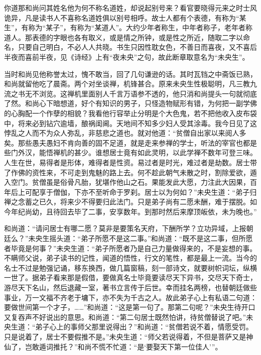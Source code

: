 \documentclass[a4paper,12pt,UTF8,twoside]{ctexbook}
\begin{document}
你道那和尚问其姓名他为何不称名道姓，却说起别号来？看官要晓得元来之时士风诡异，凡是读书人不喜称名道姓俱以别号相呼。故士人都有个表德，有称为“某生”，有称为“某子”，有称为“某道人”。大约少年者称生，中年者称子，老年者称道人。那表德的字眼也各有取义，或是情之所钟，或是性之所近，随取二字以命名，只要自己明白，不必人人共晓。书生只因性耽女色，不善日而喜夜，又不喜后半夜而喜前半夜，见《诗经》上有“夜未央”之句，故此断章取意名为“未央生”。

当时和尚见他称誉太过，愧不敢当，回了几句谦逊的话。其时瓦铛之中斋饭已熟，和尚就留他吃了晨斋。两个对坐谈禅，机锋甚合。原来未央生性极聪明，凡三教九流之书无不浏览。这禅机里面别人千言万语参不透的，他只消和尚提头一句就彻底了然。和尚心下暗想道，好个有知识的男子，只怪造物赋形有错，为何把一副学佛的心胸配一个作孽的相貌？我看他行容举止分明是个大色鬼，若不把他收入皮布袋中，将来必到钻穴逾墙，酿祸闺阃。天地间不知多少妇人受其涂毒。我今日见了这悖乱之人而不为众人弥乱，非慈悲之道也。就对他道：“贫僧自出家以来阅人多矣。那些愚夫愚妇不肯向善的固不足道，就是走来参禅的学士，听法的宰官也都是些门外汉，能悟禅机的甚少。谁想居士竟有如此灵明，以此学禅不数年可登三味。人生在世，易得者是形体，难得者是性资。易过者是时光，难过者是劫数。居士带了作佛的资性来，不可走到鬼魅的路上去。何不趁此朝气未散之时，割除爱欲，遁入空门。贫僧虽是俗骨凡胎，犹堪作他山之石。果能发此大愿，力注此大因果，百年后上可配享于僧伽，下亦不至听命于罗刹。居士以为何如？”未央生道：“弟子归禅之念蓄之已久，将来少不得要归此法门。只是弟子尚有二愿未酬，难于摆脱。如今年纪尚幼，且待回去毕了二事，安享数年。到那时然后来摩顶皈依，未为晚也。”

和尚道：“请问居士有哪二愿？莫非是要策名天府，下酬所学？立功异域，上报朝廷么？”未央生摇头道：“弟子所愿不是这二事。”和尚道：“既不是这二事，但所愿者毕竟是何事？”未央生道：“弟子所愿者乃是自己力量做得来的，不是妄想的事。不瞒师父说，弟子读书的记性，闻道的悟性，行文的笔性，都是最上一流。当今的名士不过是勉强记诵，移东换西，做几篇窗稿，刻一部诗文，就要树帜词坛，纵横一世了。据弟子看来那是假借，要做真名士毕竟要读尽天下异书，交尽天下奇士，游尽天下名山，然后退藏一室，著书立言传于后世。幸而挂名两榜，也替朝廷做些事业，万一文福不齐老于墉下，亦不失为千古之人。故此弟子心上有私语二句道：要做世间第一个才子，……”和尚道：“这是第一句了。那第二句呢？”未央生待开口又复吞声不好说出的意思。和尚道：“第二句居士既然怕讲，待贫僧替说了吧。”未央生道：“弟子心上的事师父那里说得出？”和尚道：“贫僧若说不着，情愿受罚。只是说着了，居士不要假推不是。”未央生道：“师父若说得着，不但是菩萨又是神仙了，岂敢遁词推托？”和尚不慌不忙道：“是‘要娶天下第一位佳人’”。
\end{document}
